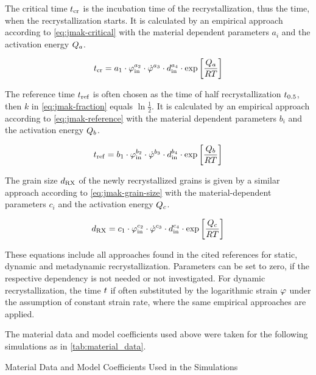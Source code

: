 The critical time ${t}_{\mathrm{cr}}$ is the incubation time of the recrystallization, thus the time, when the recrystallization starts.
It is calculated by an empirical approach according to \autoref{eq:jmak-critical} with the material dependent parameters $a_i$ and the activation energy ${Q}_a$.

\begin{equation}
    {t}_{{\mathrm{cr}}} = a_1 \cdot {\varphi}_{{\mathrm{in}}}^{a_2} \cdot {\dot{\varphi}}^{a_3} \cdot {d}_{{\mathrm{in}}}^{a_4} \cdot \exp \left[ \frac{{Q}_a}{{R} {T}} \right]
    \label{eq:jmak-critical}
\end{equation}

The reference time ${t}_{\mathrm{ref}}$ is often chosen as the time of half recrystallization ${t}_{0.5}$, then $k$ in \autoref{eq:jmak-fraction} equals $\ln \frac12$.
It is calculated by an empirical approach according to \autoref{eq:jmak-reference} with the material dependent parameters $b_i$ and the activation energy ${Q}_b$.

\begin{equation}
    {t}_{{\mathrm{ref}}} = b_1 \cdot {\varphi}_{{\mathrm{in}}}^{b_2} \cdot {\dot{\varphi}}^{b_3} \cdot {d}_{{\mathrm{in}}}^{b_4} \cdot \exp \left[ \frac{{Q}_b}{{R} {T}} \right]
    \label{eq:jmak-reference}
\end{equation}

The grain size ${d}_{\mathrm{RX}}$ of the newly recrystallized grains is given by a similar approach according to \autoref{eq:jmak-grain-size} with the material-dependent parameters $c_i$ and the activation energy ${Q}_c$.

\begin{equation}
    {d}_{\mathrm{RX}} = c_1 \cdot {\varphi}_{{\mathrm{in}}}^{c_2} \cdot {\dot{\varphi}}^{c_3} \cdot {d}_{{\mathrm{in}}}^{c_4} \cdot \exp \left[ \frac{{Q}_c}{{R} {T}} \right]
    \label{eq:jmak-grain-size}
\end{equation}

These equations include all approaches found in the cited references for static, dynamic and metadynamic recrystallization.
Parameters can be set to zero, if the respective dependency is not needed or not investigated.
For dynamic recrystallization, the time ${t}$ if often substituted by the logarithmic strain ${\varphi}$ under the assumption of constant strain rate, where the same empirical approaches are applied.

The material data and model coefficients used above were taken for the following simulations as in \autoref{tab:material_data}.

\begin{table}
    \centering
    \caption{Material Data and Model Coefficients Used in the Simulations}
    \label{tab:material_data}
    
\end{table}


